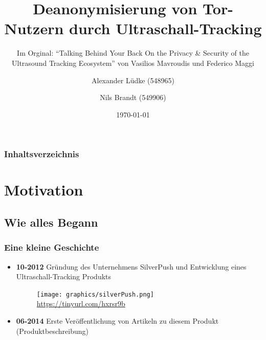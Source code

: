 \documentclass{beamer}
\begin{document}
%
%

\title{Deanonymisierung von Tor-Nutzern durch Ultraschall-Tracking}

\subtitle{Im Orginal: "`Talking Behind Your Back
On the Privacy \& Security of the Ultrasound Tracking Ecosystem"' von Vasilios Mavroudis und Federico Maggi}

\author{
{\rm Alexander Lüdke} (548965) \\
\and %
{\rm Nils Brandt} (549906)
}

\date{\today}
\begin{frame}
\titlepage
\end{frame}

\begin{frame}
\frametitle{Inhaltsverzeichnis}\tableofcontents
\end{frame}

%
%

\section{Motivation}
	\subsection{Wie alles Begann}
		\begin{frame}\frametitle{Eine kleine Geschichte}
		\begin{itemize}
			\item \textbf{10-2012} Gründung des Unternehmens SilverPush und Entwicklung eines Ultraschall-Tracking Produkts
				\begin{figure}
				\begin{center}			
				\texttt{[image: graphics/silverPush.png]}\\
				\tiny\url{https://tinyurl.com/hxrsr9b}
				\tiny\url{}
				\end{center}
				\end{figure}	
			\item \textbf{06-2014} Erste Veröffentlichung von Artikeln zu diesem Produkt (Produktbeschreibung)
		\end{itemize}
		\end{frame}
		
\end{document}
